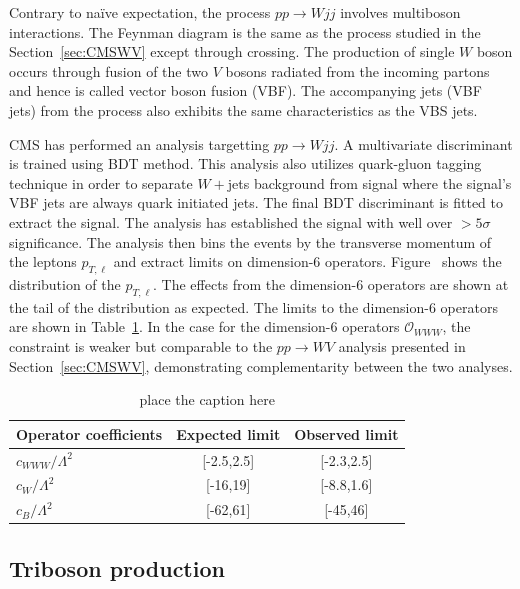 \documentclass[10pt]{article}
\begin{document}
Contrary to na\"ive expectation, the process $pp \to W jj$ involves multiboson interactions.
The Feynman diagram is the same as the process studied in the Section~\ref{sec:CMSWV} except through crossing.
The production of single $W$ boson occurs through fusion of the two $V$ bosons radiated from the incoming partons and hence is called vector boson fusion (VBF).
The accompanying jets (VBF jets) from the process also exhibits the same characteristics as the VBS jets.

CMS has performed an analysis targetting $pp \to W jj$.
A multivariate discriminant is trained using BDT method.
This analysis also utilizes quark-gluon tagging technique in order to separate $W+$jets background from signal where the signal's VBF jets are always quark initiated jets.
The final BDT discriminant is fitted to extract the signal.
The analysis has established the signal with well over $>5\sigma$ significance.
The analysis then bins the events by the transverse momentum of the leptons $p_{T,\ell}$ and extract limits on dimension-6 operators.
Figure~ shows the distribution of the $p_{T,\ell}$.
The effects from the dimension-6 operators are shown at the tail of the distribution as expected.
The limits to the dimension-6 operators are shown in Table~\ref{tab:CMSVBFWLimits}.
In the case for the dimension-6 operators $\mathcal{O}_{WWW}$, the constraint is weaker but comparable to the $pp \to WV$ analysis presented in Section~\ref{sec:CMSWV}, demonstrating complementarity between the two analyses.

\begin{table}[t]
\begin{center}
\caption{ place the caption here }
\label{tab:CMSVBFWLimits}
\begin{tabular}{l|cc}  
Operator coefficients & Expected limit & Observed limit\\ \hline
$c_{WWW} / \Lambda^2$ & [-2.5,2.5]     & [-2.3,2.5]    \\
$c_{W} / \Lambda^2$   & [-16,19]       & [-8.8,1.6]    \\
$c_{B} / \Lambda^2$   & [-62,61]       & [-45,46]      \\
\end{tabular}
\end{center}
\end{table}
\subsection{Triboson production}
\end{document}
